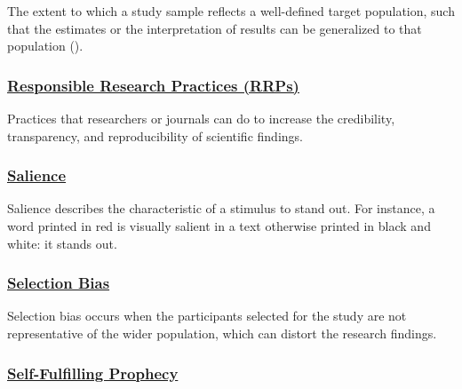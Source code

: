 \documentclass[
  letterpaper,
]{book}
\begin{document}
The extent to which a study sample reflects a well-defined target
population, such that the estimates or the interpretation of results can
be generalized to that population
().

\subsubsection*{\texorpdfstring{\hyperref[def-responsibleresearchpractices]{Responsible
Research Practices
(RRPs)}}{Responsible Research Practices (RRPs)}}\label{responsible-research-practices-rrps}

Practices that researchers or journals can do to increase the
credibility, transparency, and reproducibility of scientific findings.

\subsubsection*{\texorpdfstring{\hyperref[def-salience]{Salience}}{Salience}}\label{salience}

Salience describes the characteristic of a stimulus to stand out. For
instance, a word printed in red is visually salient in a text otherwise
printed in black and white: it stands out.

\subsubsection*{\texorpdfstring{\hyperref[def-selectionbias]{Selection
Bias}}{Selection Bias}}\label{selection-bias}

Selection bias occurs when the participants selected for the study are
not representative of the wider population, which can distort the
research findings.

\subsubsection*{\texorpdfstring{\hyperref[def-selffulfillingprophecy]{Self-Fulfilling
Prophecy}}{Self-Fulfilling Prophecy}}\label{self-fulfilling-prophecy}
\end{document}
